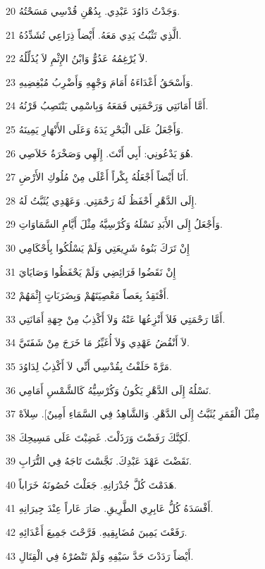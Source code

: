 \par 20 وَجَدْتُ دَاوُدَ عَبْدِي. بِدُهْنِ قُدْسِي مَسَحْتُهُ.
\par 21 الَّذِي تَثْبُتُ يَدِي مَعَهُ. أَيْضاً ذِرَاعِي تُشَدِّدُهُ.
\par 22 لاَ يُرْغِمُهُ عَدُوٌّ وَابْنُ الإِثْمِ لاَ يُذَلِّلُهُ.
\par 23 وَأَسْحَقُ أَعْدَاءَهُ أَمَامَ وَجْهِهِ وَأَضْرِبُ مُبْغِضِيهِ.
\par 24 أَمَّا أَمَانَتِي وَرَحْمَتِي فَمَعَهُ وَبِاسْمِي يَنْتَصِبُ قَرْنُهُ.
\par 25 وَأَجْعَلُ عَلَى الْبَحْرِ يَدَهُ وَعَلَى الأَنْهَارِ يَمِينَهُ.
\par 26 هُوَ يَدْعُونِي: أَبِي أَنْتَ. إِلَهِي وَصَخْرَةُ خَلاَصِي.
\par 27 أَنَا أَيْضاً أَجْعَلُهُ بِكْراً أَعْلَى مِنْ مُلُوكِ الأَرْضِ.
\par 28 إِلَى الدَّهْرِ أَحْفَظُ لَهُ رَحْمَتِي. وَعَهْدِي يُثَبَّتُ لَهُ.
\par 29 وَأَجْعَلُ إِلَى الأَبَدِ نَسْلَهُ وَكُرْسِيَّهُ مِثْلَ أَيَّامِ السَّمَاوَاتِ.
\par 30 إِنْ تَرَكَ بَنُوهُ شَرِيعَتِي وَلَمْ يَسْلُكُوا بِأَحْكَامِي
\par 31 إِنْ نَقَضُوا فَرَائِضِي وَلَمْ يَحْفَظُوا وَصَايَايَ
\par 32 أَفْتَقِدُ بِعَصاً مَعْصِيَتَهُمْ وَبِضَرَبَاتٍ إِثْمَهُمْ.
\par 33 أَمَّا رَحْمَتِي فَلاَ أَنْزِعُهَا عَنْهُ وَلاَ أَكْذِبُ مِنْ جِهَةِ أَمَانَتِي.
\par 34 لاَ أَنْقُضُ عَهْدِي وَلاَ أُغَيِّرُ مَا خَرَجَ مِنْ شَفَتَيَّ.
\par 35 مَرَّةً حَلَفْتُ بِقُدْسِي أَنِّي لاَ أَكْذِبُ لِدَاوُدَ.
\par 36 نَسْلُهُ إِلَى الدَّهْرِ يَكُونُ وَكُرْسِيُّهُ كَالشَّمْسِ أَمَامِي.
\par 37 مِثْلَ الْقَمَرِ يُثَبَّتُ إِلَى الدَّهْرِ. وَالشَّاهِدُ فِي السَّمَاءِ أَمِينٌ]. سِلاَهْ
\par 38 لَكِنَّكَ رَفَضْتَ وَرَذَلْتَ. غَضِبْتَ عَلَى مَسِيحِكَ.
\par 39 نَقَضْتَ عَهْدَ عَبْدِكَ. نَجَّسْتَ تَاجَهُ فِي التُّرَابِ.
\par 40 هَدَمْتَ كُلَّ جُدْرَانِهِ. جَعَلْتَ حُصُونَهُ خَرَاباً.
\par 41 أَفْسَدَهُ كُلُّ عَابِرِي الطَّرِيقِ. صَارَ عَاراً عِنْدَ جِيرَانِهِ.
\par 42 رَفَعْتَ يَمِينَ مُضَايِقِيهِ. فَرَّحْتَ جَمِيعَ أَعْدَائِهِ.
\par 43 أَيْضاً رَدَدْتَ حَدَّ سَيْفِهِ وَلَمْ تَنْصُرْهُ فِي الْقِتَالِ.
